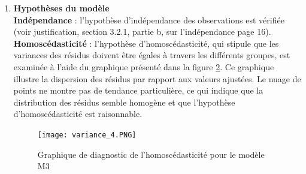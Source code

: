 \documentclass[12pt,a4paper]{article}
\begin{document}
\begin{enumerate}[label=\textbf{\alph*})]
\textit{\textbf{\underline{Représentation graphique des interactions}}}\\

Les graphiques des interactions entre les facteurs genre et milieu géographique, présentés dans la figure \ref{fig:interactions_3}, montrent que les profils ne sont pas parallèles. La moyenne de \texttt{ecart\_MVPA} des filles ou des garçons diffère selon le milieu géographique, et vice versa. Ces graphiques suggèrent une interaction entre le genre et le milieu géographique.\\

\begin{figure}[H]
	\centering
	\texttt{[image: Interaction\_3.PNG]}
	\caption{Interactions entre les facteurs Genre et Milieu géographique}
	\label{fig:interactions_3}
\end{figure}

\noindent
Avant d'examiner les résultats des tests associés au modèle M3, il est essentiel de vérifier que les conditions d'application du modèle sont respectées.

	
\item \textbf{Hypothèses du modèle} \\

\noindent
\textbf{Indépendance} : l'hypothèse d'indépendance des observations est vérifiée (voir justification, section 3.2.1, partie b, sur l'indépendance page 16).\\

\noindent
\textbf{Homoscédasticité} : l'hypothèse d'homoscédasticité, qui stipule que les variances des résidus doivent être égales à travers les différents groupes, est examinée à l'aide du graphique présenté dans la figure \ref{fig:variance3}. Ce graphique illustre la dispersion des résidus par rapport aux valeurs ajustées. Le nuage de points ne montre pas de tendance particulière, ce qui indique que la distribution des résidus semble homogène et que l'hypothèse d'homoscédasticité est raisonnable.
\begin{figure}[H]
	\centering
	\texttt{[image: variance\_4.PNG]}
	\caption{Graphique de diagnostic de l'homoscédasticité pour le modèle M3}
	\label{fig:variance3}
\end{figure}


\end{enumerate}
\end{document}

